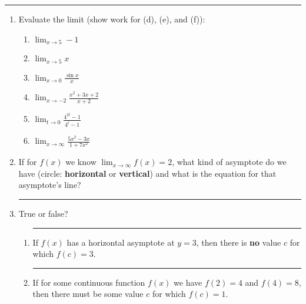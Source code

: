 \documentclass[11pt]{article}
\begin{document}
\Large



\medskip\hrule
\vspace{10pt}

\begin{enumerate}

\item Evaluate the limit (show work for (d), (e), and (f)):
\begin{multicols}{2}
\begin{enumerate}
    \item{$\displaystyle{\lim_{x \to 5} -1}$} \\
    \item $\displaystyle{\lim_{x \to 5} x}$ \\
    \item $\displaystyle{\lim_{x \to 0} \frac{\sin{x}}{x}}$ \\
    \item $\displaystyle{\lim_{x \to -2} \frac{x^2 + 3x + 2}{x + 2}}$ \\
    \item $\displaystyle{\lim_{t \to 0} \frac{4^{2t} - 1}{4^t - 1}}$ \\
    \item $\displaystyle{\lim_{x \to \infty} \frac{5x^2 - 3x}{1 + 7x^2}}$ \\
\end{enumerate}
\end{multicols}

\item If for $f(x)$ we know $\lim_{x \to \infty} f(x) = 2$, what kind of asymptote do we have (circle: \textbf{horizontal} or \textbf{vertical}) and what is the equation for that asymptote's line?

\begin{flushright}\noindent\rule{4cm}{0.4pt}\end{flushright}

\item True or false?
\begin{enumerate}
    \item \rule{1cm}{0.4pt} If $f(x)$ has a horizontal asymptote at $y=3$, then there is \textbf{no} value $c$ for which $f(c)=3$.
    \item \rule{1cm}{0.4pt} If for some continuous function $f(x)$ we have $f(2)=4$ and $f(4)=8$, then there must be some value $c$ for which $f(c)=1$.
\end{enumerate} 


\end{enumerate}
\end{document}
